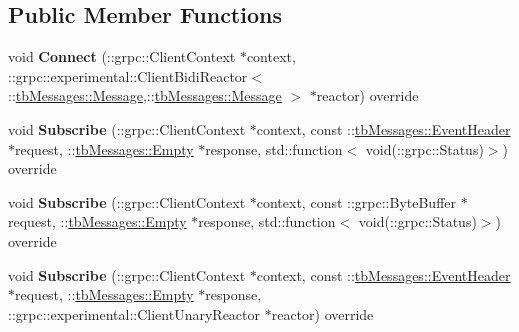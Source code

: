 \subsection*{Public Member Functions}
\begin{DoxyCompactItemize}
\item 
\mbox{\label{classtbMessages_1_1TarboraMessages_1_1Stub_1_1experimental__async_a855fc986d13856bd3d308070aa96e180}} 
void {\bfseries Connect} (\+::grpc\+::\+Client\+Context $\ast$context, \+::grpc\+::experimental\+::\+Client\+Bidi\+Reactor$<$ \+::\hyperlink{classtbMessages_1_1Message}{tb\+Messages\+::\+Message},\+::\hyperlink{classtbMessages_1_1Message}{tb\+Messages\+::\+Message} $>$ $\ast$reactor) override
\item 
\mbox{\label{classtbMessages_1_1TarboraMessages_1_1Stub_1_1experimental__async_a0ee0308563527ff0ad9c14c44584f4c2}} 
void {\bfseries Subscribe} (\+::grpc\+::\+Client\+Context $\ast$context, const \+::\hyperlink{classtbMessages_1_1EventHeader}{tb\+Messages\+::\+Event\+Header} $\ast$request, \+::\hyperlink{classtbMessages_1_1Empty}{tb\+Messages\+::\+Empty} $\ast$response, std\+::function$<$ void(\+::grpc\+::\+Status)$>$) override
\item 
\mbox{\label{classtbMessages_1_1TarboraMessages_1_1Stub_1_1experimental__async_a395c98899e693fa2edcaf8d8bbf56091}} 
void {\bfseries Subscribe} (\+::grpc\+::\+Client\+Context $\ast$context, const \+::grpc\+::\+Byte\+Buffer $\ast$request, \+::\hyperlink{classtbMessages_1_1Empty}{tb\+Messages\+::\+Empty} $\ast$response, std\+::function$<$ void(\+::grpc\+::\+Status)$>$) override
\item 
\mbox{\label{classtbMessages_1_1TarboraMessages_1_1Stub_1_1experimental__async_a03ad7bb628e4904b6f4249bbde52a34e}} 
void {\bfseries Subscribe} (\+::grpc\+::\+Client\+Context $\ast$context, const \+::\hyperlink{classtbMessages_1_1EventHeader}{tb\+Messages\+::\+Event\+Header} $\ast$request, \+::\hyperlink{classtbMessages_1_1Empty}{tb\+Messages\+::\+Empty} $\ast$response, \+::grpc\+::experimental\+::\+Client\+Unary\+Reactor $\ast$reactor) override
\item 

\end{DoxyCompactItemize}
